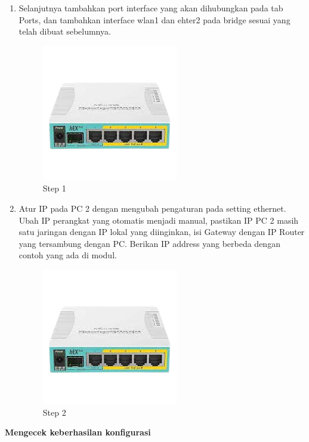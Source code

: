 \begin{enumerate}
	\item Selanjutnya tambahkan port interface yang akan dihubungkan pada tab Ports, dan tambahkan
	interface wlan1 dan ehter2 pada bridge sesuai yang telah dibuat sebelumnya.
	\begin{figure}[H]
		\centering
		\includegraphics[width=0.5\linewidth]{P1/img/contoh.png}
		\caption{Step 1}
		\label{fig:gambar26}
	\end{figure}

	\item Atur IP pada PC 2 dengan mengubah pengaturan pada setting ethernet. Ubah IP perangkat
	yang otomatis menjadi manual, pastikan IP PC 2 masih satu jaringan dengan IP lokal yang
	diinginkan, isi Gateway dengan IP Router yang tersambung dengan PC. Berikan IP address
	yang berbeda dengan contoh yang ada di modul.
	\begin{figure}[H]
		\centering
		\includegraphics[width=0.5\linewidth]{P1/img/contoh.png}
		\caption{Step 2}
		\label{fig:gambar27}
	\end{figure}

\end{enumerate}

\begin{center} 
	\textbf{Mengecek keberhasilan konfigurasi}
\end{center}


